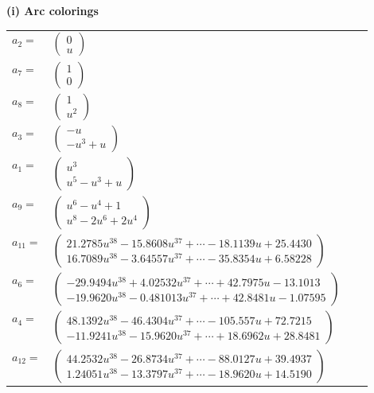 \documentclass[1p]{elsarticle_modified}
\theoremstyle{definition}
\begin{document}
\flushleft \textbf{(i) Arc colorings}\\
\begin{tabular}{m{7pt} m{180pt} m{7pt} m{180pt} }
\flushright $a_{2}=$&$\begin{pmatrix}0\\u\end{pmatrix}$ \\
\flushright $a_{7}=$&$\begin{pmatrix}1\\0\end{pmatrix}$ \\
\flushright $a_{8}=$&$\begin{pmatrix}1\\u^2\end{pmatrix}$ \\
\flushright $a_{3}=$&$\begin{pmatrix}- u\\- u^3+u\end{pmatrix}$ \\
\flushright $a_{1}=$&$\begin{pmatrix}u^3\\u^5- u^3+u\end{pmatrix}$ \\
\flushright $a_{9}=$&$\begin{pmatrix}u^6- u^4+1\\u^8-2 u^6+2 u^4\end{pmatrix}$ \\
\flushright $a_{11}=$&$\begin{pmatrix}21.2785 u^{38}-15.8608 u^{37}+\cdots-18.1139 u+25.4430\\16.7089 u^{38}-3.64557 u^{37}+\cdots-35.8354 u+6.58228\end{pmatrix}$ \\
\flushright $a_{6}=$&$\begin{pmatrix}-29.9494 u^{38}+4.02532 u^{37}+\cdots+42.7975 u-13.1013\\-19.9620 u^{38}-0.481013 u^{37}+\cdots+42.8481 u-1.07595\end{pmatrix}$ \\
\flushright $a_{4}=$&$\begin{pmatrix}48.1392 u^{38}-46.4304 u^{37}+\cdots-105.557 u+72.7215\\-11.9241 u^{38}-15.9620 u^{37}+\cdots+18.6962 u+28.8481\end{pmatrix}$ \\
\flushright $a_{12}=$&$\begin{pmatrix}44.2532 u^{38}-26.8734 u^{37}+\cdots-88.0127 u+39.4937\\1.24051 u^{38}-13.3797 u^{37}+\cdots-18.9620 u+14.5190\end{pmatrix}$ \\

\end{tabular}
\end{document}
